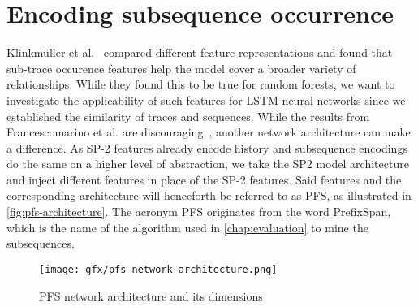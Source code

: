 \section{Encoding subsequence occurrence}
\label{sec:contrib:pfs-inspiration}
Klinkmüller et al.~\cite{klinkmuller2018reliablemonitoring} compared different feature representations and found that sub-trace occurence features help the model cover a broader variety of relationships. While they found this to be true for random forests, we want to investigate the applicability of such features for LSTM neural networks since we established the similarity of traces and sequences. While the results from Francescomarino et al. are discouraging~\cite{francescomarino2017}, another network architecture can make a difference. As SP-2 features already encode history and subsequence encodings do the same on a higher level of abstraction, we take the SP2 model architecture and inject different features in place of the SP-2 features. Said features and the corresponding architecture will henceforth be referred to as PFS, as illustrated in \autoref{fig:pfs-architecture}. The acronym PFS originates from the word PrefixSpan, which is the name of the algorithm used in \autoref{chap:evaluation} to mine the subsequences.

\begin{figure}[ht]
    \centering
    \texttt{[image: gfx/pfs-network-architecture.png]}
    \caption{PFS network architecture and its dimensions}
    \label{fig:pfs-architecture}
\end{figure}
